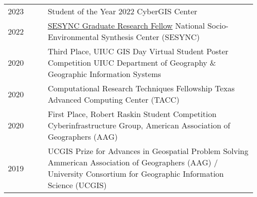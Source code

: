 \documentclass{acmcv}
\begin{document}
    \begin{longtable}{p{0.16\linewidth} p{0.84\linewidth}}
        2023 & Student of the Year 2022 \newline CyberGIS Center\\

        2022 & \href{https://www.sesync.org/project/graduate-pursuits-request-for-proposals/financial-opacity-and-challenges-to-forest}{SESYNC Graduate Research Fellow} \newline National Socio-Environmental Synthesis Center (SESYNC)\\

        2020 & Third Place, UIUC GIS Day Virtual Student Poster Competition \newline UIUC Department of Geography \& Geographic Information Systems \\

        2020 & Computational Research Techniques Fellowship \newline Texas Advanced Computing Center (TACC)\\

        2020 & First Place, Robert Raskin Student Competition \newline Cyberinfrastructure Group, American Association of Geographers (AAG) \\

        2019 & UCGIS Prize for Advances in Geospatial Problem Solving \newline Ammerican Association of Geographers (AAG) / University Consortium for Geographic Information Science (UCGIS)  \\





    \end{longtable}
\end{document}
